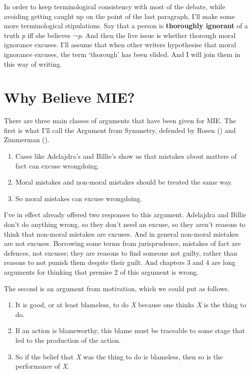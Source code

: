 \documentclass[
  10pt,
  letterpaper,
  twoside]{scrbook}
\providecommand{\tightlist}{%
  \setlength{\itemsep}{0pt}\setlength{\parskip}{0pt}}\usepackage{longtable,booktabs,array}
\begin{document}
In order to keep terminological consistency with most of the debate,
while avoiding getting caught up on the point of the last paragraph,
I'll make some more terminological stipulations. Say that a person is
\textbf{thoroughly ignorant} of a truth \emph{p} iff she believes
¬\emph{p}. And then the live issue is whether thorough moral ignorance
excuses. I'll assume that when other writers hypothesise that moral
ignorance excuses, the term `thorough' has been elided. And I will join
them in this way of writing.

\section{Why Believe MIE?}\label{whybelievemie}

There are three main classes of arguments that have been given for MIE.
The first is what I'll call the Argument from Symmetry, defended by
Rosen () and Zimmerman
().

\begin{enumerate}
\def\labelenumi{\arabic{enumi}.}
\tightlist
\item
  Cases like Adelajdra's and {Billie}'s show us that mistakes about
  matters of fact can excuse wrongdoing.
\item
  Moral mistakes and non-moral mistakes should be treated the same way.
\item
  So moral mistakes can excuse wrongdoing.
\end{enumerate}

I've in effect already offered two responses to this argument. Adelajdra
and {Billie} don't do anything wrong, so they don't need an excuse, so
they aren't reasons to think that non-moral mistakes are excuses. And in
general non-moral mistakes are not excuses. Borrowing some terms from
jurisprudence, mistakes of fact are defences, not excuses; they are
reasons to find someone not guilty, rather than reasons to not punish
them despite their guilt. And chapters 3 and 4 are long arguments for
thinking that premise 2 of this argument is wrong.

The second is an argument from motivation, which we could put as
follows.

\begin{enumerate}
\def\labelenumi{\arabic{enumi}.}
\tightlist
\item
  It is good, or at least blameless, to do \emph{X} because one thinks
  \emph{X} is the thing to do.
\item
  If an action is blameworthy, this blame must be traceable to some
  stage that led to the production of the action.
\item
  So if the belief that \emph{X} was the thing to do is blameless, then
  so is the performance of \emph{X}.
\end{enumerate}
\end{document}
